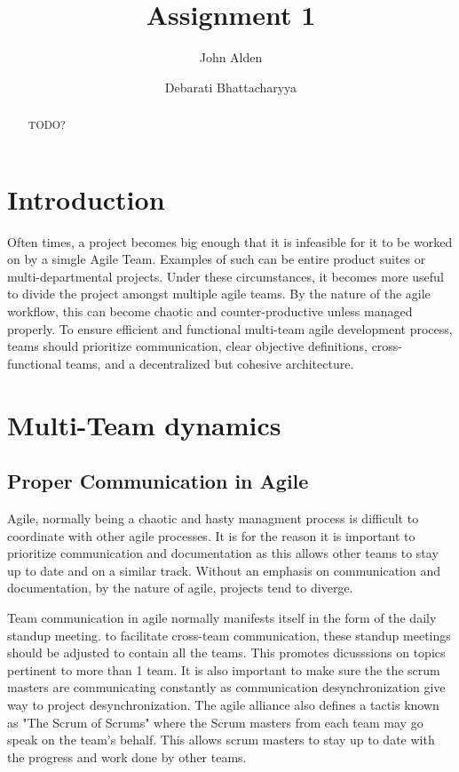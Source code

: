 \documentclass[sigplan,screen]{acmart}
\begin{document}
\title{Assignment 1}

%
%
\author{John Alden}

\author{Debarati Bhattacharyya}

%
%
\begin{abstract}
TODO?
\end{abstract}

%
%
\maketitle

%
%
\section{Introduction}
Often times, a project becomes big enough that it is infeasible for it to be worked on by a simgle Agile Team. Examples of such can be entire product suites or multi-departmental projects. Under these circumstances, it becomes more useful to divide the project amongst multiple agile teams. By the nature of the agile workflow, this can become chaotic and counter-productive unless managed properly. To ensure efficient and functional multi-team agile development process, teams should prioritize communication, clear objective definitions, cross-functional teams, and a decentralized but cohesive architecture.

\section{Multi-Team dynamics}
\subsection{Proper Communication in Agile}
Agile, normally being a chaotic and hasty managment process is difficult to coordinate with other agile processes. It is for the reason it is important to prioritize communication and documentation as this allows other teams to stay up to date and on a similar track. Without an emphasis on communication and documentation, by the nature of agile, projects tend to diverge.

Team communication in agile normally manifests itself in the form of the daily standup meeting. to facilitate cross-team communication, these standup meetings should be adjusted to contain all the teams. This promotes dicusssions on topics pertinent to more than 1 team. It is also important to make sure the the scrum masters are communicating constantly as communication desynchronization give way to project desynchronization. The agile alliance also defines a tactis known as "The Scrum of Scrums" where the Scrum masters from each team may go speak on the team's behalf. This allows scrum masters to stay up to date with the progress and work done by other teams.
\end{document}
